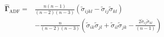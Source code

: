 \begin{equation}
	\begin{split}
		\hat{\boldsymbol{\Gamma}}_{\mathrm{ADF}}
		= &
		\frac{
			n
			\left( n - 1 \right)
			}{
			\left( n - 2 \right)
			\left( n - 3 \right)
		}
		\left( 
		\tilde{\sigma}_{ijkl}
		-
		\tilde{\sigma}_{ij}
		\tilde{\sigma}_{kl}    
		\right) \\
		& -
		\frac{
			n
			}{
			\left( n - 2 \right)
			\left( n - 3 \right)
		}
		\left(
		\tilde{\sigma}_{ik}
		\tilde{\sigma}_{jl}  
		+
		\tilde{\sigma}_{il}
		\tilde{\sigma}_{jk}
		-
		\frac{
			2
			\tilde{\sigma}_{ij}
			\tilde{\sigma}_{kl}  
			}{
			\left( n - 1 \right)
		}
		\right)
	\end{split}
	\label{eq:gammaMatrix-gammacap-adf-unbiased}
\end{equation}
